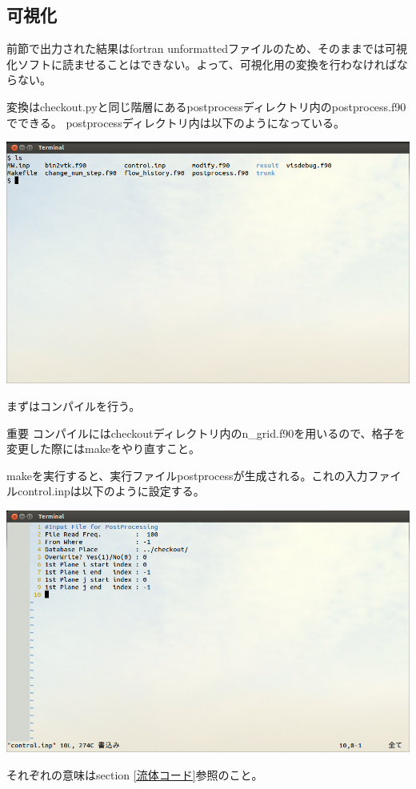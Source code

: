 \documentclass{jsarticle}
\begin{document}
\subsection{可視化}%
前節で出力された結果はfortran unformattedファイルのため、そのままでは可視化ソフトに読ませることはできない。よって、可視化用の変換を行わなければならない。

変換はcheckout.pyと同じ階層にあるpostprocessディレクトリ内のpostprocess.f90でできる。
postprocessディレクトリ内は以下のようになっている。
\begin{center}
\includegraphics[width=.8\textwidth,bb=0 0 962 577]{tutorial_img/220.png}
\end{center}
まずはコンパイルを行う。
\begin{itembox}[l]{重要}
コンパイルにはcheckoutディレクトリ内のn\_grid.f90を用いるので、格子を変更した際にはmakeをやり直すこと。
\end{itembox}
makeを実行すると、実行ファイルpostprocessが生成される。これの入力ファイルcontrol.inpは以下のように設定する。
\begin{center}
\includegraphics[width=.8\textwidth,bb=0 0 962 577]{tutorial_img/230.png}
\end{center}
それぞれの意味はsection \ref{流体コード}参照のこと。
\end{document}
